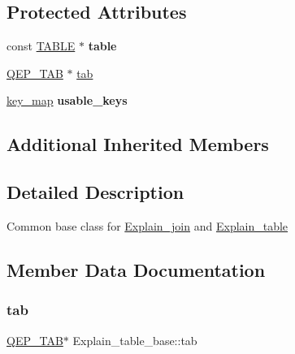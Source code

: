 \subsection*{Protected Attributes}
\begin{DoxyCompactItemize}
\item 
\mbox{\label{classExplain__table__base_a7c86975702d8f57c25e1e6b99a526f3e}} 
const \mbox{\hyperlink{structTABLE}{T\+A\+B\+LE}} $\ast$ {\bfseries table}
\item 
\mbox{\hyperlink{classQEP__TAB}{Q\+E\+P\+\_\+\+T\+AB}} $\ast$ \mbox{\hyperlink{classExplain__table__base_ab8546ecb7443ca29d5f3abced9ce1b70}{tab}}
\item 
\mbox{\label{classExplain__table__base_ad2d5a0efa9782e70df2412c9c7b7c2af}} 
\mbox{\hyperlink{classBitmap_3_0164_01_4}{key\+\_\+map}} {\bfseries usable\+\_\+keys}
\end{DoxyCompactItemize}
\subsection*{Additional Inherited Members}


\subsection{Detailed Description}
Common base class for \mbox{\hyperlink{classExplain__join}{Explain\+\_\+join}} and \mbox{\hyperlink{classExplain__table}{Explain\+\_\+table}} 

\subsection{Member Data Documentation}
\mbox{\label{classExplain__table__base_ab8546ecb7443ca29d5f3abced9ce1b70}} 
\subsubsection{\texorpdfstring{tab}{tab}}
{\footnotesize\ttfamily \mbox{\hyperlink{classQEP__TAB}{Q\+E\+P\+\_\+\+T\+AB}}$\ast$ Explain\+\_\+table\+\_\+base\+::tab\hspace{0.3cm}{\ttfamily [protected]}}

